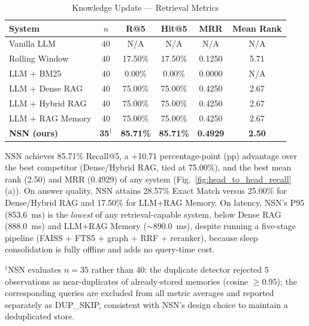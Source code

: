 \documentclass[conference]{IEEEtran}
\begin{document}
\begin{table}[t]
\caption{Knowledge Update --- Retrieval Metrics}
\label{tab:ku-retrieval}
\centering
\scriptsize
\begin{tabular}{@{}lccccc@{}}
\toprule
\textbf{System} & $n$ & \textbf{R@5} & \textbf{Hit@5} & \textbf{MRR} & \textbf{Mean Rank} \\
\midrule
Vanilla LLM & 40 & N/A & N/A & N/A & N/A \\
Rolling Window & 40 & 17.50\% & 17.50\% & 0.1250 & 5.71 \\
LLM + BM25 & 40 & 0.00\% & 0.00\% & 0.0000 & N/A \\
LLM + Dense RAG & 40 & 75.00\% & 75.00\% & 0.4250 & 2.67 \\
LLM + Hybrid RAG & 40 & 75.00\% & 75.00\% & 0.4250 & 2.67 \\
LLM + RAG Memory & 40 & 75.00\% & 75.00\% & 0.4250 & 2.67 \\
\textbf{NSN (ours)} & \textbf{35}$^{\dagger}$ & \textbf{85.71\%} & \textbf{85.71\%} & \textbf{0.4929} & \textbf{2.50} \\
\bottomrule
\end{tabular}
\end{table}

NSN achieves 85.71\% Recall@5, a +10.71 percentage-point (pp) advantage over the best competitor (Dense/Hybrid RAG, tied at 75.00\%), and the best mean rank (2.50) and MRR (0.4929) of any system (Fig.~\ref{fig:head_to_head_recall}(a)). On answer quality, NSN attains 28.57\% Exact Match versus 25.00\% for Dense/Hybrid RAG and 17.50\% for LLM+RAG Memory. On latency, NSN's P95 (853.6~ms) is the \emph{lowest} of any retrieval-capable system, below Dense RAG (888.0~ms) and LLM+RAG Memory ($\sim$890.0~ms), despite running a five-stage pipeline (FAISS + FTS5 + graph + RRF + reranker), because sleep consolidation is fully offline and adds no query-time cost.

$^{\dagger}$NSN evaluates $n=35$ rather than 40: the duplicate detector rejected 5 observations as near-duplicates of already-stored memories (cosine $\geq 0.95$); the corresponding queries are excluded from all metric averages and reported separately as DUP\_SKIP, consistent with NSN's design choice to maintain a deduplicated store.
\end{document}
